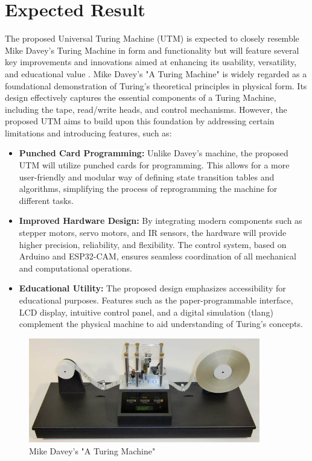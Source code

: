 \chapter{Expected Result}

The proposed Universal Turing Machine (UTM) is expected to closely resemble Mike Davey's Turing Machine in form and functionality but will feature several key improvements and innovations aimed at enhancing its usability, versatility, and educational value \cite{davey2010}. Mike Davey's "A Turing Machine" is widely regarded as a foundational demonstration of Turing's theoretical principles in physical form. Its design effectively captures the essential components of a Turing Machine, including the tape, read/write heads, and control mechanisms. However, the proposed UTM aims to build upon this foundation by addressing certain limitations and introducing features, such as:
\begin{itemize}
    \item \textbf{Punched Card Programming:} Unlike Davey's machine, the proposed UTM will utilize punched cards for programming. This allows for a more user-friendly and modular way of defining state transition tables and algorithms, simplifying the process of reprogramming the machine for different tasks.
    \item \textbf{Improved Hardware Design:} By integrating modern components such as stepper motors, servo motors, and IR sensors, the hardware will provide higher precision, reliability, and flexibility. The control system, based on Arduino and ESP32-CAM, ensures seamless coordination of all mechanical and computational operations.
    \item \textbf{Educational Utility:} The proposed design emphasizes accessibility for educational purposes. Features such as the paper-programmable interface, LCD display, intuitive control panel, and a digital simulation (tlang) complement the physical machine to aid understanding of Turing's concepts.
\end{itemize}

\begin{figure}[h!]
    \centering
    \includegraphics[width=0.9\textwidth]{content/images/mikeDavey.jpg}
    \caption{Mike Davey's "A Turing Machine"}
    \label{fig:expectedOutcome}
\end{figure}


